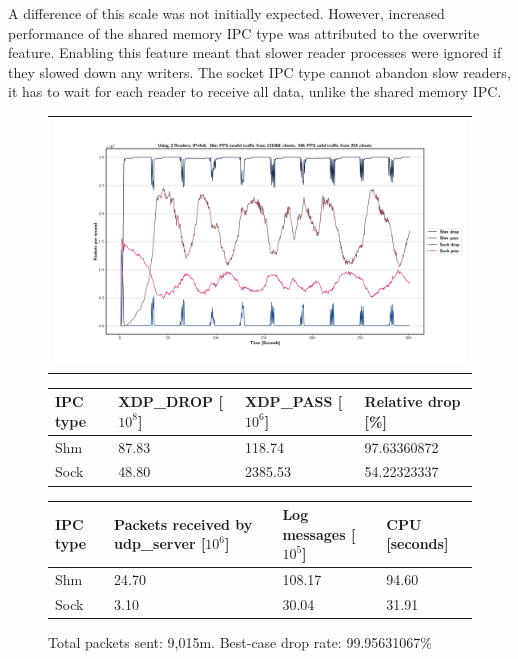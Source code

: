 A difference of this scale was not initially expected.
However, increased performance of the shared memory \ac{IPC} type was attributed to the overwrite feature.
Enabling this feature meant that slower reader processes were ignored if they slowed down any writers.
The socket \ac{IPC} type cannot abandon slow readers, it has to wait for each reader to receive all data, unlike the shared memory \ac{IPC}.

\begin{figure}[!h]
	\centering
	\scriptsize
	\begin{tabular}{c}
    	\centerline{\includegraphics[width=1.2\textwidth]{images/IPv4v6_30m_2ndReader_1.png}}
	\end{tabular}
	\begin{tabular}{llll}
		\toprule
		\textbf{IPC type} & \textbf{XDP\_DROP [$10^8$]} & \textbf{XDP\_PASS [$10^6$]} & \textbf{Relative drop [\%]} \\ \midrule 
		Shm & 87.83 & 118.74 & 97.63360872 \\
        Sock & 48.80 & 2385.53 & 54.22323337 \\
	\bottomrule
	\end{tabular}
    \begin{tabular}{llll}
		\toprule
		\textbf{IPC type} & \textbf{Packets received by udp\_server [$10^6$]} & \textbf{Log messages [$10^5$]} & \textbf{CPU [seconds]} \\ \midrule 
		Shm & 24.70 & 108.17 & 94.60 \\
        Sock & 3.10 & 30.04 & 31.91 \\
	\bottomrule
	\end{tabular}
	\caption[Simplefail2ban with 2nd Reader, IPv4v6, 30m \ac{PPS}, 131,068 malicious clients]{Total packets sent: 9,015m. Best-case drop rate: 99.95631067\%}
	\label{fig:data:ipv4v6:30m:131068:2nd}
\end{figure}

